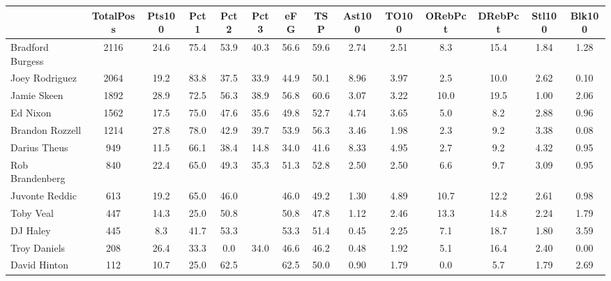 \documentclass[10pt,letterpaper]{article}
\begin{document}
\begin{table}[ht]
\begin{center}
\begin{tabular}{lccccccccccccc}
  \hline
 & TotalPoss & Pts100 & Pct1 & Pct2 & Pct3 & eFG & TSP & Ast100 & TO100 & ORebPct & DRebPct & Stl100 & Blk100 \\ 
  \hline
Bradford Burgess & 2116 & 24.6 & 75.4 & 53.9 & 40.3 & 56.6 & 59.6 & 2.74 & 2.51 & 8.3 & 15.4 & 1.84 & 1.28 \\ 
  Joey Rodriguez & 2064 & 19.2 & 83.8 & 37.5 & 33.9 & 44.9 & 50.1 & 8.96 & 3.97 & 2.5 & 10.0 & 2.62 & 0.10 \\ 
  Jamie Skeen & 1892 & 28.9 & 72.5 & 56.3 & 38.9 & 56.8 & 60.6 & 3.07 & 3.22 & 10.0 & 19.5 & 1.00 & 2.06 \\ 
  Ed Nixon & 1562 & 17.5 & 75.0 & 47.6 & 35.6 & 49.8 & 52.7 & 4.74 & 3.65 & 5.0 & 8.2 & 2.88 & 0.96 \\ 
  Brandon Rozzell & 1214 & 27.8 & 78.0 & 42.9 & 39.7 & 53.9 & 56.3 & 3.46 & 1.98 & 2.3 & 9.2 & 3.38 & 0.08 \\ 
  Darius Theus & 949 & 11.5 & 66.1 & 38.4 & 14.8 & 34.0 & 41.6 & 8.33 & 4.95 & 2.7 & 9.2 & 4.32 & 0.95 \\ 
  Rob Brandenberg & 840 & 22.4 & 65.0 & 49.3 & 35.3 & 51.3 & 52.8 & 2.50 & 2.50 & 6.6 & 9.7 & 3.09 & 0.95 \\ 
  Juvonte Reddic & 613 & 19.2 & 65.0 & 46.0 &  & 46.0 & 49.2 & 1.30 & 4.89 & 10.7 & 12.2 & 2.61 & 0.98 \\ 
  Toby Veal & 447 & 14.3 & 25.0 & 50.8 &  & 50.8 & 47.8 & 1.12 & 2.46 & 13.3 & 14.8 & 2.24 & 1.79 \\ 
  DJ Haley & 445 & 8.3 & 41.7 & 53.3 &  & 53.3 & 51.4 & 0.45 & 2.25 & 7.1 & 18.7 & 1.80 & 3.59 \\ 
  Troy Daniels & 208 & 26.4 & 33.3 & 0.0 & 34.0 & 46.6 & 46.2 & 0.48 & 1.92 & 5.1 & 16.4 & 2.40 & 0.00 \\ 
  David Hinton & 112 & 10.7 & 25.0 & 62.5 &  & 62.5 & 50.0 & 0.90 & 1.79 & 0.0 & 5.7 & 1.79 & 2.69 \\ 
   \hline
\end{tabular}
\end{center}
\end{table}
\end{document}
